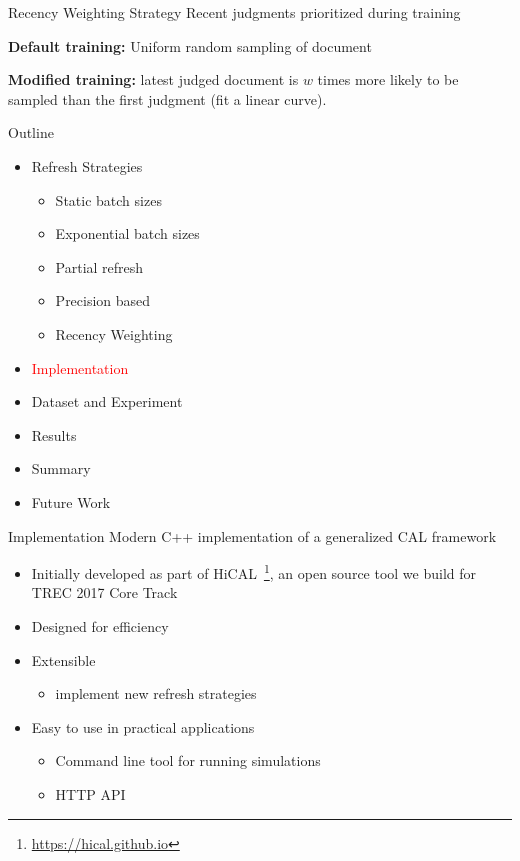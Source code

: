 \documentclass[14pt]{beamer}
\newcommand{\red}[1]{\textcolor{red}{#1}}
\begin{document}
\begin{frame}{Recency Weighting Strategy}
Recent judgments prioritized during training
\vskip 1cm

\textbf{Default training:} Uniform random sampling of document

\pause
\vskip 0.5cm
\textbf{Modified training:} latest judged document is $w$ times more likely to be
sampled than the first judgment (fit a linear curve).
\end{frame}


\begin{frame}{Outline}
\begin{itemize}
    \item Refresh Strategies
    \begin{itemize}
        \item Static batch sizes
        \item Exponential batch sizes
        \item Partial refresh
        \item Precision based
        \item Recency Weighting
    \end{itemize}
    \item \red{Implementation}
    \item Dataset and Experiment
    \item Results
    \item Summary
    \item Future Work
\end{itemize}
\end{frame}

\begin{frame}{Implementation}
    Modern C++ implementation of a generalized CAL framework
    \begin{itemize}
        \item Initially developed as part of
            HiCAL~\footnote{\url{https://hical.github.io}}, an open source tool
            we build for TREC 2017 Core Track~\cite{zhang2017uwaterloomds,
            sigirdemo}
        \item Designed for efficiency
        \item Extensible
            \begin{itemize}
                \item implement new refresh strategies
            \end{itemize}
        \item Easy to use in practical applications
            \begin{itemize}
                \item Command line tool for running simulations
                \item HTTP API
            \end{itemize}
    \end{itemize}
\end{frame}
\end{document}
